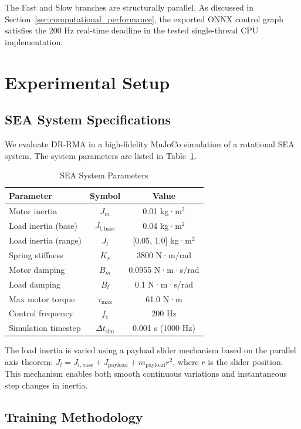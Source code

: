\documentclass[lettersize,journal]{IEEEtran}
\begin{document}
The Fast and Slow branches are structurally parallel. As discussed in Section~\ref{sec:computational_performance}, the exported ONNX control graph satisfies the 200 Hz real-time deadline in the tested single-thread CPU implementation.

\section{Experimental Setup}

\subsection{SEA System Specifications}

We evaluate DR-RMA in a high-fidelity MuJoCo simulation of a rotational SEA system. The system parameters are listed in Table~\ref{tab:system_params}.

\begin{table}[t]
\centering
\caption{SEA System Parameters}
\label{tab:system_params}
\begin{tabular}{@{}lcc@{}}
\toprule
Parameter & Symbol & Value \\
\midrule
Motor inertia & $J_m$ & 0.01 kg·m$^2$ \\
Load inertia (base) & $J_{l,\text{base}}$ & 0.04 kg·m$^2$ \\
Load inertia (range) & $J_l$ & [0.05, 1.0] kg·m$^2$ \\
Spring stiffness & $K_s$ & 3800 N·m/rad \\
Motor damping & $B_m$ & 0.0955 N·m·s/rad \\
Load damping & $B_l$ & 0.1 N·m·s/rad \\
Max motor torque & $\tau_{\max}$ & 61.0 N·m \\
Control frequency & $f_c$ & 200 Hz \\
Simulation timestep & $\Delta t_{\text{sim}}$ & 0.001 s (1000 Hz) \\
\bottomrule
\end{tabular}
\end{table}

The load inertia is varied using a payload slider mechanism based on the parallel axis theorem: $J_l = J_{l,\text{base}} + J_{\text{payload}} + m_{\text{payload}} r^2$, where $r$ is the slider position. This mechanism enables both smooth continuous variations and instantaneous step changes in inertia.

\subsection{Training Methodology}
\end{document}
